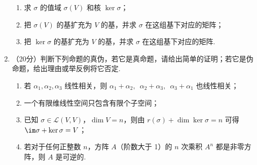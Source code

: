 \begin{enumerate}
\begin{enumerate}
        \item 求 $\sigma$ 的值域 $\sigma(V)$ 和核 $\ker \sigma$；

        \item 把 $\sigma(V)$ 的基扩充为 $V$ 的基，并求 $\sigma$ 在这组基下对应的矩阵；

        \item 把 $\ker \sigma$ 的基扩充为 $V$ 的基，并求 $\sigma$ 在这组基下对应的矩阵.
    \end{enumerate}

    \item （20分）判断下列命题的真伪，若它是真命题，请给出简单的证明；若它是伪命题，给出理由或举反例将它否定.
    \begin{enumerate}
        \item 若 $\alpha_1,\alpha_2,\alpha_3$ 线性相关，则 $\alpha_1+\alpha_2,\enspace \alpha_2+\alpha_3,\enspace \alpha_3+\alpha_1$ 也线性相关；

        \item 一个有限维线性空间只包含有限个子空间；

        \item 已知 $\sigma \in \mathcal{L}(V,V)$，$\dim V=n$，则由 $r(\sigma)+\dim\ker\sigma=n$ 可得$\im \sigma+\ker \sigma=V$；

        \item 若对于任何正整数 $n$，方阵 $A$（阶数大于 1）的 $n$ 次乘积 $A^n$ 都是非零方阵，则 $A$ 是可逆的.
    \end{enumerate}
\end{enumerate}

\clearpage
